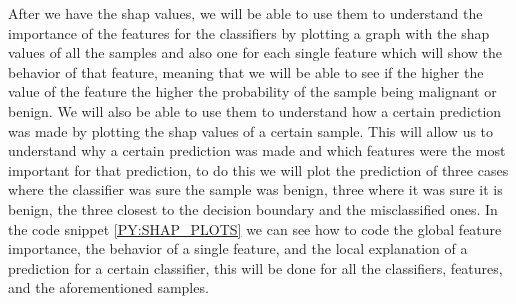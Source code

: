 After we have the \ac{shap} values, we will be able to use them to understand the importance of the features for the classifiers by plotting a graph with the \ac{shap} values of all the samples and also one for each single feature which will show the behavior of that feature, meaning that we will be able to see if the higher the value of the feature the higher the probability of the sample being malignant or benign. 
We will also be able to use them to understand how a certain prediction was made by plotting the \ac{shap} values of a certain sample. 
This will allow us to understand why a certain prediction was made and which features were the most important for that prediction, to do this we  
will 
plot 
the prediction of three cases where the classifier was sure the sample was 
benign, three where it was sure it is benign, 
the three closest to the decision boundary and 
the 
misclassified ones. In the code snippet \ref{PY:SHAP_PLOTS} we can see how to code the global feature importance, the behavior of a single feature, and the local explanation of a prediction for a certain classifier, this will be done for all the classifiers, features, and the aforementioned samples.


